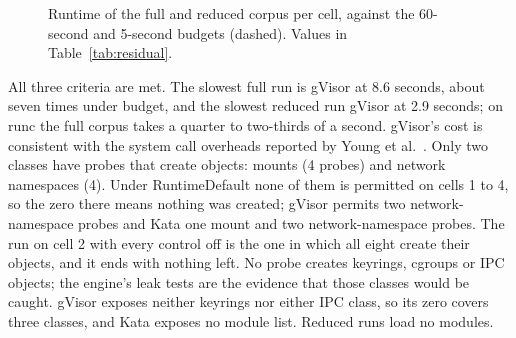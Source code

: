 \begin{figure}[htbp]
\centering
{}
\caption{Runtime of the full and reduced corpus per cell, against the 60-second and 5-second budgets (dashed). Values in Table~\ref{tab:residual}.}
\label{fig:runtime}
\end{figure}

All three criteria are met. The slowest full run is gVisor at 8.6 seconds, about seven times under budget, and the slowest reduced run gVisor at 2.9 seconds; on runc the full corpus takes a quarter to two-thirds of a second. gVisor's cost is consistent with the system call overheads reported by Young et al.~\cite{young2019gvisor}. Only two classes have probes that create objects: mounts (4 probes) and network namespaces (4). Under RuntimeDefault none of them is permitted on cells 1 to 4, so the zero there means nothing was created; gVisor permits two network-namespace probes and Kata one mount and two network-namespace probes. The run on cell 2 with every control off is the one in which all eight create their objects, and it ends with nothing left. No probe creates keyrings, cgroups or IPC objects; the engine's leak tests are the evidence that those classes would be caught. gVisor exposes neither keyrings nor either IPC class, so its zero covers three classes, and Kata exposes no module list. Reduced runs load no modules.

